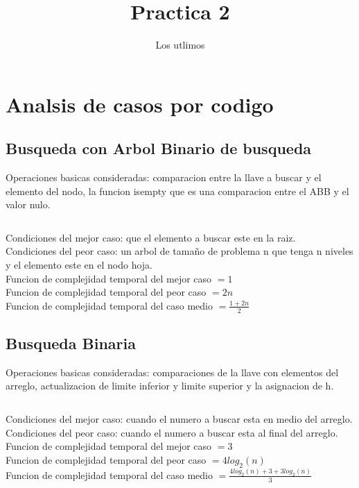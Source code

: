 \documentclass[12pt]{report}
\title{Practica 2}
\author{Los utlimos}
\begin{document}
\maketitle
\section*{Analsis de casos por codigo}
\subsection*{Busqueda con Arbol Binario de busqueda}
Operaciones basicas consideradas: comparacion entre la llave a buscar y el elemento del nodo, la funcion isempty que es una comparacion entre el ABB y el valor nulo.\\
\inputminted[firstline = 82, lastline = 91]{C}{babinario.c}
Condiciones del mejor caso: que el elemento a buscar este en la raiz.\\
Condiciones del peor caso: un arbol de tamaño de problema n que tenga n niveles y el elemento este en el nodo hoja.\\
Funcion de complejidad temporal del mejor caso $= 1$\\
Funcion de complejidad temporal del peor caso $= 2n$\\
Funcion de complejidad temporal del caso medio $= \frac{1+2n}{2}$
\newpage
\subsection*{Busqueda Binaria}
Operaciones basicas consideradas: comparaciones de la llave con elementos del arreglo, actualizacion de limite inferior y limite superior y la asignacion de h.\\
\inputminted[firstline = 15, lastline = 30]{C}{bbinaria.c}
Condiciones del mejor caso: cuando el numero a buscar esta en medio del arreglo.\\
Condiciones del peor caso: cuando el numero a buscar esta al final del arreglo.\\
Funcion de complejidad temporal del mejor caso $= 3$\\
Funcion de complejidad temporal del peor caso $= 4log_2(n)$\\
Funcion de complejidad temporal del caso medio $= \frac{4log_2(n) + 3 + 3log_2(n)}{3}$
\newpage
\end{document}
